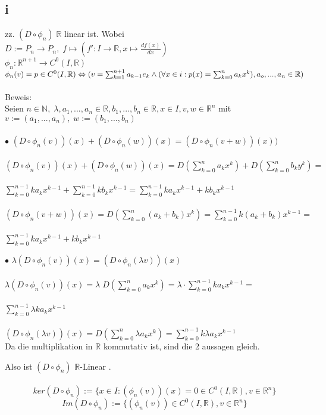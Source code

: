 \documentclass[10pt,a4paper]{article}
\begin{document}
\subsection{i}
zz. $ (D \circ \phi_n) \;\mathbb{R}$ linear ist. Wobei\\
$D := P_n \rightarrow P_n, \; f \mapsto (f' : I \rightarrow \mathbb{R}, x \mapsto \frac{df(x)}{dx})$\\
$ \phi_n : \mathbb{R}^{n+1}\rightarrow C^0(I,\mathbb{R})$ \\
$ \phi_n(v) = p \in C^0(I,\mathbb{R}) \Leftrightarrow \\(v= \sum_{k=1}^{n+1} a_{k-1}e_k \wedge (\forall x \in i : p(x) =  \sum_{k=0}^{n}a_kx^k), a_o,...,a_n \in \mathbb{R})$ \\\\
Beweis:\\
Seien $n\in \mathbb{N}, \; \lambda , a_1,...,a_n \in \mathbb{R}, b_1,...,b_n \in \mathbb{R}, x \in I,v,w \in \mathbb{R}^{n} $ mit $v := (a_1,...,a_n),\;w:=(b_1,...,b_n)$\\\\
$\bullet$ $ (D \circ \phi_n (v))(x)+(D \circ \phi_n(w))(x) = (D \circ \phi_n(v+w))(x))$\\\\
$ (D \circ \phi_n(v))(x)+(D \circ \phi_n(w))(x) = D( \sum_{k=0}^{n}a_kx^k )+D( \sum_{k=0}^{n}b_ky^k )=$\\\\
$ \sum_{k=0}^{n-1}ka_kx^{k-1} + \sum_{k=0}^{n-1}kb_kx^{k-1} =\sum_{k=0}^{n-1}ka_kx^{k-1} + kb_kx^{k-1} $ \\\\
$ (D \circ \phi_n(v+w))(x) = D(\sum_{k=0}^{n}(a_k+b_k)x^{k} ) = \sum_{k=0}^{n-1}k(a_k+b_k)x^{k-1} =$\\\\
$\sum_{k=0}^{n-1}ka_kx^{k-1} + kb_kx^{k-1}$
\begin{flushright}\checkmark\end{flushright}
$\bullet$ $ \lambda (D \circ \phi_n(v))(x) = (D \circ \phi_n(\lambda v))(x) $\\\\
$ \lambda (D \circ \phi_n(v))(x) = \lambda \;D( \sum_{k=0}^{n}a_kx^k ) = \lambda \cdot \sum_{k=0}^{n-1}ka_k x^{k-1}= $\\\\
$ \sum_{k=0}^{n-1} \lambda ka_kx^{k-1} $\\\\
$(D \circ \phi_n(\lambda v))(x) = D( \sum_{k=0}^{n}\lambda a_kx^k ) = \sum_{k=0}^{n-1}k\lambda a_kx^{k-1} $\\
Da die multiplikation in $\mathbb{R}$ kommutativ ist, sind die 2 aussagen gleich.\begin{flushright}\checkmark\end{flushright}
Also ist $(D \circ \phi_n)$ $\mathbb{R}$-Linear .\\\\
$$ker(D \circ \phi_n):= \{x\in I: (\phi_n(v))(x)=0 \in  C^0(I,\mathbb{R}), v \in \mathbb{R}^n \}$$
$$Im(D \circ \phi_n):= \{(\phi_n(v)) \in  C^0(I,\mathbb{R}), v \in \mathbb{R}^n \}$$
\end{document}
